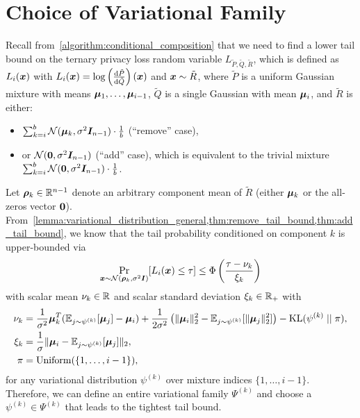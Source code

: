 \section{Choice of Variational Family}\label{appendix:choice_of_variational_family}
Recall from~\cref{algorithm:conditional_composition} that we need to find a lower tail bound on the ternary privacy loss  random variable $L_{\tilde{P}, \tilde{Q}, \tilde{R}}$,
which is defined as $L_i({\bm{x}})$ with $L_i({\bm{x}}) = \log\left(\frac{\mathrm{d} \tilde{P}}{\mathrm{d} \tilde{Q}}\right)({\bm{x}})$ and ${\bm{x}} \sim \tilde{R}$,
where $\tilde{P}$ is a uniform Gaussian mixture with means ${\bm{\mu}}_1,\dots,{\bm{\mu}}_{i-1}$,
$\tilde{Q}$ is a single Gaussian with mean ${\bm{\mu}}_i$,
and $\tilde{R}$ is either:
\begin{itemize}
    \item $\sum_{k=i}^{b} \mathcal{N}({\bm{\mu}}_k, \sigma^2 {\bm{I}}_{n-1}) \cdot \frac{1}{b}$ (``remove'' case),
    \item or $\mathcal{N}({\bm{0}}, \sigma^2 {\bm{I}}_{n-1})$ (``add'' case), which is equivalent to the trivial mixture
    $\sum_{k=i}^{b} \mathcal{N}({\bm{0}}, \sigma^2 {\bm{I}}_{n-1}) \cdot \frac{1}{b}$.
\end{itemize}
Let ${\bm{\rho}}_k \in {\mathbb{R}}^{n-1}$ denote an arbitrary component mean of $\tilde{R}$ (either ${\bm{\mu}}_k$ or the all-zeros vector ${\bm{0}}$).
From~\cref{lemma:variational_distribution_general,thm:remove_tail_bound,thm:add_tail_bound}, we know that the tail probability conditioned on component $k$ is upper-bounded via
\begin{equation}\label{eq:single_component_tail_bound}
    \Pr_{{\bm{x}} \sim \mathcal{N}({\bm{\rho}}_k, \sigma^2 {\bm{I}})}[L_i({\bm{x}}) \leq \tau] \leq \Phi\left( \frac{\tau - \nu_k}{\xi_k} \right)
\end{equation}
with scalar mean $\nu_k \in {\mathbb{R}}$ and scalar standard deviation $\xi_k \in {\mathbb{R}}_+$
with
\begin{align}
    \nu_k &= \frac{1}{\sigma^2} {\bm{\mu}}_k^T (\mathbb{E}_{j \sim \psi^{(k)}}[{\bm{\mu}}_j] - {\bm{\mu}}_i) + \frac{1}{2\sigma^2} \left( \|{\bm{\mu}}_i\|_2^2 - \mathbb{E}_{j \sim \psi^{(k)}}[\|{\bm{\mu}}_j\|_2^2] \right) - \mathrm{KL}(\psi^{(k)} \mid\mid \pi),
    \label{eq:variational_per_component_mean}
    \\
    \xi_k &= \frac{1}{\sigma} \| {\bm{\mu}}_i - \mathbb{E}_{j \sim \psi^{(k)}}[{\bm{\mu}}_j] \|_2,
    \label{eq:variational_per_component_std}
    \\
    \pi &= \mathrm{Uniform}(\{1,\dots,i-1\}),
\end{align}
for any variational distribution $\psi^{(k)}$ over mixture indices $\{1,\dots, i-1\}$.
Therefore, we can define an entire variational family $\Psi^{(k)}$ and choose a $\psi^{(k)} \in \Psi^{(k)}$ that leads to the tightest tail bound.

